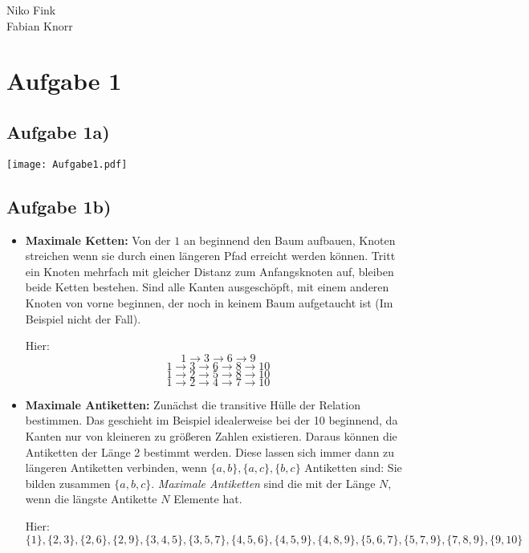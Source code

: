 \documentclass[a4paper,10pt]{article}
\begin{document}
\begin{flushright}
    Niko Fink\\
    Fabian Knorr
\end{flushright}
\vspace*{-5.5em}

\section*{Aufgabe 1}
\subsection*{Aufgabe 1a)}
\begin{center}
\texttt{[image: Aufgabe1.pdf]}
\end{center}

\subsection*{Aufgabe 1b)}

\begin{itemize}
    \item \textbf{Maximale Ketten:}
    Von der $1$ an beginnend den Baum aufbauen, Knoten streichen wenn sie durch einen längeren
    Pfad erreicht werden können. Tritt ein Knoten mehrfach mit gleicher Distanz zum Anfangsknoten
    auf, bleiben beide Ketten bestehen. Sind alle Kanten ausgeschöpft, mit einem anderen Knoten von
    vorne beginnen, der noch in keinem Baum aufgetaucht ist (Im Beispiel nicht der Fall).

    Hier:
\[1 \rightarrow 3 \rightarrow 6 \rightarrow 9\]
\[1 \rightarrow 3 \rightarrow 6 \rightarrow 8 \rightarrow 10\]
\[1 \rightarrow 2 \rightarrow 5 \rightarrow 8 \rightarrow 10\]
\[1 \rightarrow 2 \rightarrow 4 \rightarrow 7 \rightarrow 10\]

\item \textbf{Maximale Antiketten:}
    Zunächst die transitive Hülle der Relation bestimmen. Das geschieht im Beispiel idealerweise
    bei der 10 beginnend, da Kanten nur von kleineren zu größeren Zahlen existieren. Daraus können
    die Antiketten der Länge 2 bestimmt werden. Diese lassen sich immer dann zu längeren Antiketten
    verbinden, wenn $\{a,b\}, \{a,c\}, \{b, c\}$ Antiketten sind: Sie bilden zusammen $\{a,b,c\}$.
    \textit{Maximale Antiketten} sind die mit der Länge $N$, wenn die längste Antikette $N$
    Elemente hat.

    Hier:
\[\{1\}, \{2,3\}, \{2,6\}, \{2,9\}, \{3, 4,5\}, \{3, 5, 7\}, \{4, 5, 6\}, \{4,5,9\}, \{4,8,9\},
\{5,6,7\},\{5,7,9\}, \{7,8,9\}, \{9,10\}\]
\end{itemize}
\end{document}
